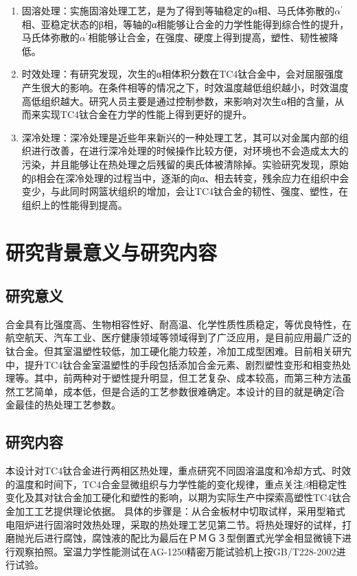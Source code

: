 \begin{enumerate}
	\item 固溶处理：实施固溶处理工艺，是为了得到等轴稳定的α相、马氏体弥散的$ α^{'} $相、亚稳定状态的β相，等轴的α相能够让合金的力学性能得到综合性的提升，马氏体弥散的$ α^{'} $相能够让合金，在强度、硬度上得到提高，塑性、韧性被降低\cite{gurong2002}。
	\item 时效处理：有研究\cite{timing}发现，次生的α相体积分数在TC4钛合金中，会对屈服强度产生很大的影响。在条件相等的情况之下，时效温度越低组织越小，时效温度高低组织越大。研究人员主要是通过控制参数，来影响对次生α相的含量，从而来实现TC4钛合金在力学的性能上得到更好的提升。
	\item 深冷处理：深冷处理是近些年来新兴的一种处理工艺，其可以对金属内部的组织进行改善，在进行深冷处理的时候操作比较方便，对环境也不会造成太大的污染，并且能够让在热处理之后残留的奥氏体被清除掉。实验研究发现，原始的β相会在深冷处理的过程当中，逐渐的向α、相去转变，残余应力在组织中会变少，与此同时网篮状组织的增加，会让TC4钛合金的韧性、强度、塑性，在组织上的性能得到提高。
\end{enumerate}

\section{研究背景意义与研究内容}
\subsection{研究意义}
\ti 合金具有比强度高、生物相容性好、耐高温、化学性质性质稳定，等优良特性，在航空航天、汽车工业、医疗健康领域等领域得到了广泛应用，是目前应用最广泛的钛合金。但其室温塑性较低，加工硬化能力较差，冷加工成型困难。目前相关研宄中，提升TC4钛合金室温塑性的手段包括添加合金元素、剧烈塑性变形和相变热处理等。其中，前两种对于塑性提升明显，但工艺复杂、成本较高\cite{miao}，而第三种方法虽然工艺简单，成本低，但是合适的工艺参数很难确定。本设计的目的就是确定\t i合金最佳的热处理工艺参数。
\subsection{研究内容}
本设计对TC4钛合金进行两相区热处理，重点研究不同固溶温度和冷却方式、时效的温度和时间下，TC4合金显微组织与力学性能的变化规律，重点关注$ \beta  $相稳定性变化及其对钛合金加工硬化和塑性的影响，以期为实际生产中探索高塑性TC4钛合金加工工艺提供理论依据。
具体的步骤是：从\ti 合金板材中切取试样，采用型箱式电阻炉进行固溶时效热处理，采取的热处理工艺见第二节。将热处理好的试样，打磨抛光后进行腐蚀，腐蚀液的配比为最后在ＰＭＧ３型倒置式光学金相显微镜下进行观察拍照。室温力学性能测试在AG-1250精密万能试验机上按{GB/T228-2002}进行试验。
